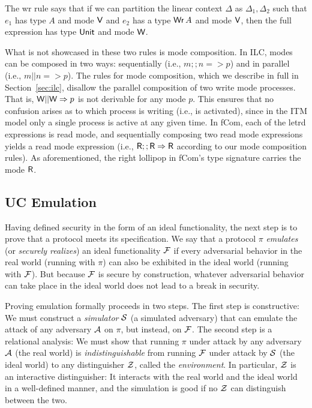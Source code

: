 The wr rule says that if we can partition the linear context $\Delta$ as $\Delta_1, \Delta_2$
such that $e_1$ has type $A$ and mode $\textsf{V}$ and $e_2$ has a type $\text{\textsf{Wr}}\,A$ and
mode $\textsf{V}$, then the full expression has type $\text{\textsf{Unit}}$ and mode $\textsf{W}$.

What is not showcased in these two rules is mode composition. In ILC, modes can
be composed in two ways: sequentially (i.e., $m ;; n => p$) and in parallel
(i.e., $m || n => p$). The rules for mode composition, which we describe in full
in Section~\ref{sec:ilc}, disallow the parallel composition of two write mode
processes. That is, $\textsf{W} || \textsf{W} => p$ is not derivable for any mode $p$. This
ensures that no confusion arises as to which process is writing (i.e., is
activated), since in the ITM model only a single process is active at any given
time. In \textsf{fCom}, each of the letrd expressions is read mode, and
sequentially composing two read mode expressions yields a read mode expression
(i.e., $\textsf{R} ;; \textsf{R} => \textsf{R}$ according to our mode composition rules). As
aforementioned, the right lollipop in \textsf{fCom}'s type signature carries the
mode $\textsf{R}$.

\subsection{UC Emulation}
\label{subsec:emulation}

Having defined security in the form of an ideal functionality, the next step is
to prove that a protocol meets its specification. We say that a protocol $\pi$
\emph{emulates} (or \emph{securely realizes}) an ideal functionality $\mathcal{{F}}$ if
every adversarial behavior in the real world (running with $\pi$) can also be
exhibited in the ideal world (running with $\mathcal{{F}}$). But because $\mathcal{{F}}$ is
secure by construction, whatever adversarial behavior can take place in the
ideal world does not lead to a break in security.

Proving emulation formally proceeds in two steps. The first step is
constructive: We must construct a \emph{simulator} $\mathcal{{S}}$ (a simulated
adversary) that can emulate the attack of any adversary $\mathcal{{A}}$ on $\pi$, but
instead, on $\mathcal{{F}}$. The second step is a relational analysis: We must show
that running $\pi$ under attack by any adversary $\mathcal{{A}}$ (the real world) is
\emph{indistinguishable} from running $\mathcal{{F}}$ under attack by $\mathcal{{S}}$ (the
ideal world) to any distinguisher $\mathcal{{Z}}$, called the \emph{environment}. In
particular, $\mathcal{{Z}}$ is an interactive distinguisher: It interacts with the real
world and the ideal world in a well-defined manner, and the simulation is good
if no $\mathcal{{Z}}$ can distinguish between the two.

